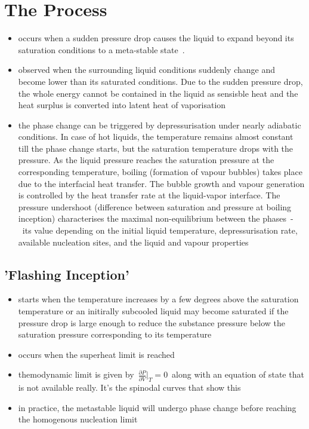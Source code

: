 \section{The Process}
\begin{itemize}
\item occurs when a sudden pressure drop causes the liquid to expand beyond its saturation conditions to a meta-stable state~\cite{Gartner2024-zh}.
\item observed when the surrounding liquid conditions suddenly change and become lower than its saturated conditions. Due to the sudden pressure drop, the whole energy cannot be contained in the liquid as sensisble heat and the heat surplus is converted into latent heat of vaporisation~\cite{sauryFlashEvaporationWater2005}
\item the phase change can be triggered by depressurisation under nearly adiabatic conditions. In case of hot liquids, the temperature remains almost constant till the phase change starts, but the saturation temperature drops with the pressure. As the liquid pressure reaches the saturation pressure at the corresponding temperature, boiling (formation of vapour bubbles) takes place due to the interfacial heat transfer. The bubble growth and vapour generation is controlled by the heat transfer rate at the liquid-vapor interface. The pressure undershoot (difference between saturation and pressure at boiling inception) characterises the maximal non-equilibrium between the phases~-~its value depending on the initial liquid temperature, depressurisation rate, available nucleation sites, and the liquid and vapour properties~\cite{liaoReviewNumericalModelling2021}
\end{itemize}

\subsection{'Flashing Inception'}
\begin{itemize}
	\item starts when the temperature increases by a few degrees above the saturation temperature or an initirally subcooled liquid may become saturated if the pressure drop is large enough to reduce the substance pressure below the saturation pressure corresponding to its temperature~\cite{mansourReviewFlashEvaporation2019}
	\item occurs when the superheat limit is reached~\cite{liaoComputationalModellingFlash2017}
	\item themodynamic limit is given by~$\frac{\partial P}{\partial V}|_{T} = 0$~along with an equation of state that is not available really. It's the spinodal curves that show this~\cite{liaoComputationalModellingFlash2017}
	\item in practice, the metastable liquid will undergo phase change before reaching the homogenous nucleation limit~\cite{liaoComputationalModellingFlash2017}
\end{itemize}


